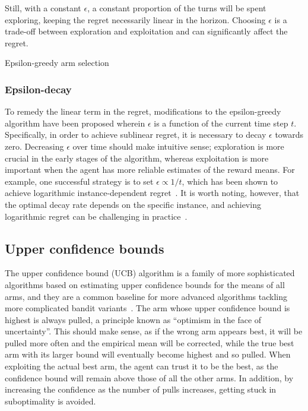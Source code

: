 Still, with a constant $\epsilon$, a constant proportion of the turns will be spent exploring, keeping the regret necessarily linear in the horizon.
Choosing $\epsilon$ is a trade-off between exploration and exploitation and can significantly affect the regret.

\begin{algorithm}
    \caption{Epsilon-greedy arm selection}
    \label{alg:eps_greedy}
    \eIf{$t \leq mk$}{
    \Return $(t \mod k) + 1$\;
    }{
    Sample $u$ from $[0,1)$ uniformly\;
    \eIf{$u < \epsilon$}{
        Sample $a$ from $\mathcal{A}$ uniformly\;
        \Return $a$\;
    }{
        \Return $\argmax_{a \in \mathcal{A}}\hat{\mu}_a$\;
    }
    }
\end{algorithm}

\subsubsection{Epsilon-decay}
To remedy the linear term in the regret, modifications to the epsilon-greedy algorithm have been proposed wherein $\epsilon$ is a function of the current time step $t$.
Specifically, in order to achieve sublinear regret, it is necessary to decay $\epsilon$ towards zero.
Decreasing $\epsilon$ over time should make intuitive sense; exploration is more crucial in the early stages of the algorithm, whereas exploitation is more important when the agent has more reliable estimates of the reward means.
For example, one successful strategy is to set $\epsilon \propto 1/t$, which has been shown to achieve logarithmic instance-dependent regret~\autocite{auer2002}.
It is worth noting, however, that the optimal decay rate depends on the specific instance, and achieving logarithmic regret can be challenging in practice~\autocite{bubeck2012}.


\subsection{Upper confidence bounds}
\label{sec:ucb}
The upper confidence bound (UCB) algorithm is a family of more sophisticated algorithms based on estimating upper confidence bounds for the means of all arms, and they are a common baseline for more advanced algorithms tackling more complicated bandit variants~\autocite{li2010}.
The arm whose upper confidence bound is highest is always pulled, a principle known as \enquote{optimism in the face of uncertainty}.
This should make sense, as if the wrong arm appears best, it will be pulled more often and the empirical mean will be corrected, while the true best arm with its larger bound will eventually become highest and so pulled.
When exploiting the actual best arm, the agent can trust it to be the best, as the confidence bound will remain above those of all the other arms.
In addition, by increasing the confidence as the number of pulls increases, getting stuck in suboptimality is avoided.

